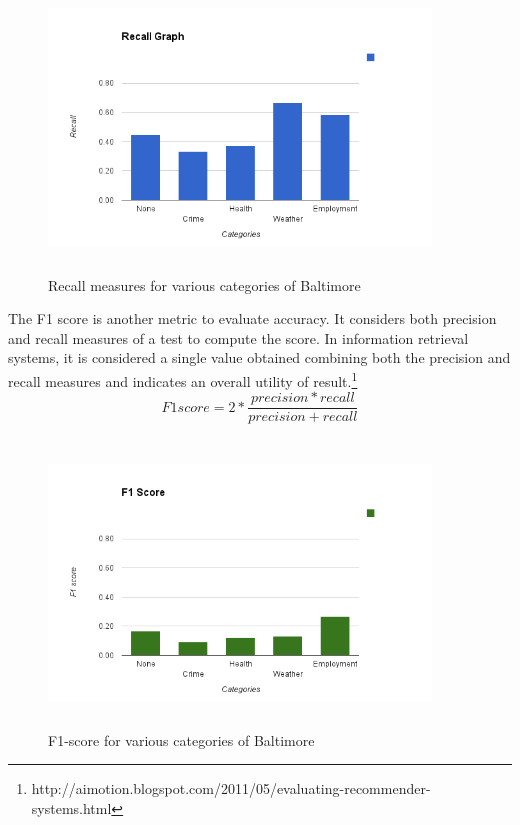 \documentclass[conference]{IEEEtran}
\begin{document}
\begin{figure}[h]
\includegraphics[height=3in, width=4in]{recall.png}
\caption{Recall measures for various categories of Baltimore}
\label{recall}
\end{figure}

The F1 score is another metric to evaluate accuracy.  It considers both precision and recall measures of a test to compute the score. In information retrieval systems, it is considered a single value obtained combining both the precision and recall measures and indicates an overall utility of result.\footnote{http://aimotion.blogspot.com/2011/05/evaluating-recommender-systems.html}
\begin{equation}
F1 score = 2 * \frac{precision * recall}{precision + recall}
\end{equation}

\begin{figure}[h]
\includegraphics[height=3in, width=4in]{f1score.png}
\caption{F1-score for various categories of Baltimore}
\label{f1}
\end{figure}
\end{document}
